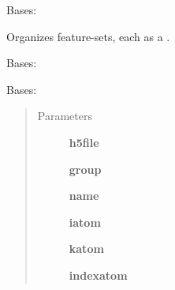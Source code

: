\documentclass[letterpaper,10pt,english]{sphinxmanual}
\begin{document}
\begin{fulllineitems}
\label{tethne.persistence.hdf5.util:tethne.persistence.hdf5.util.HDF5Features}
Bases: 

Organizes feature-sets, each as a .

\end{fulllineitems}


\begin{fulllineitems}
\label{tethne.persistence.hdf5.util:tethne.persistence.hdf5.util.HDF5Metadata}
Bases: 

\end{fulllineitems}


\begin{fulllineitems}
\label{tethne.persistence.hdf5.util:tethne.persistence.hdf5.util.HDF5SparseValues}
Bases: 
\begin{quote}\begin{description}
\item[{Parameters}] \leavevmode
\textbf{h5file}

\textbf{group}

\textbf{name}

\textbf{iatom}

\textbf{katom}

\textbf{indexatom}

\end{description}\end{quote}

\begin{fulllineitems}
\label{tethne.persistence.hdf5.util:tethne.persistence.hdf5.util.HDF5SparseValues.iteritems}
\end{fulllineitems}


\end{fulllineitems}
\end{document}
